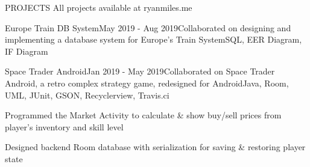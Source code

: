 \documentclass{resume} %
\begin{document}
\begin{rSectionProjects}{PROJECTS} {All projects available at ryanmiles.me}
\begin{rSubsectionProjects}{Europe Train DB System}{May 2019 - Aug 2019}{Collaborated on designing and implementing a database system for Europe's Train System}{SQL, EER Diagram, IF Diagram} {}
\end{rSubsectionProjects} 


\begin{rSubsectionProjects}{Space Trader Android}{Jan 2019 - May 2019}{Collaborated on Space Trader Android, a retro complex strategy game, redesigned for Android}{Java, Room, UML, JUnit, GSON, Recyclerview, Travis.ci} {}
	\item Programmed the Market Activity to calculate \& show buy/sell prices from player's inventory and skill level
	\item Designed backend Room database with serialization for saving \& restoring player state
	
\end{rSubsectionProjects} 


\end{rSectionProjects} 
\end{document}
